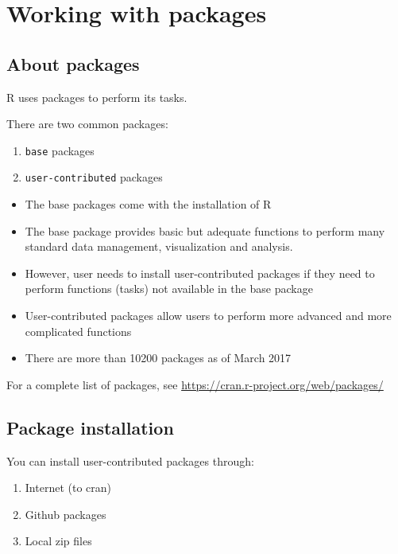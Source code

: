 \documentclass[]{book}
\providecommand{\tightlist}{%
  \setlength{\itemsep}{0pt}\setlength{\parskip}{0pt}}
\theoremstyle{definition}
\theoremstyle{definition}
\theoremstyle{remark}
\begin{document}
\section{Working with packages}\label{working-with-packages}

\subsection{About packages}\label{about-packages}

R uses packages to perform its tasks.

There are two common packages:

\begin{enumerate}
\def\labelenumi{\arabic{enumi}.}
\tightlist
\item
  \texttt{base} packages
\item
  \texttt{user-contributed} packages
\end{enumerate}

\begin{itemize}
\tightlist
\item
  The base packages come with the installation of R
\item
  The base package provides basic but adequate functions to perform many
  standard data management, visualization and analysis.
\item
  However, user needs to install user-contributed packages if they need
  to perform functions (tasks) not available in the base package
\item
  User-contributed packages allow users to perform more advanced and
  more complicated functions
\item
  There are more than 10200 packages as of March 2017
\end{itemize}

For a complete list of packages, see
\url{https://cran.r-project.org/web/packages/}

\subsection{Package installation}\label{package-installation}

You can install user-contributed packages through:

\begin{enumerate}
\def\labelenumi{\arabic{enumi}.}
\tightlist
\item
  Internet (to cran)
\item
  Github packages
\item
  Local zip files
\end{enumerate}
\end{document}
